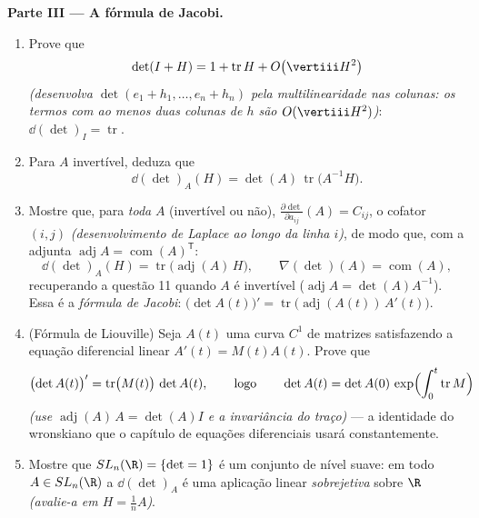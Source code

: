 \begin{problem}
\medskip
\noindent\textbf{Parte III --- A fórmula de Jacobi.}
\begin{enumerate}[resume]
  \item Prove que
        \[
        \det(I + H) = 1 + \operatorname{tr}H +
        O\bigl(\vertiii H^2\bigr)
        \]
        \emph{(desenvolva $\det(e_1 + h_1, \dots, e_n + h_n)$ pela
        multilinearidade nas colunas: os termos com ao menos duas
        colunas de $h$ são $O(\vertiii H^2)$)}: $\dd(\det)_I =
        \operatorname{tr}$.
  \item Para $A$ invertível, deduza que
        \[
        \dd(\det)_A(H) = \det(A)\,
        \operatorname{tr}\bigl(A^{-1}H\bigr) .
        \]
  \item Mostre que, para \emph{toda} $A$ (invertível ou não),
        $\frac{\partial\det}{\partial a_{ij}}(A) = C_{ij}$, o
        cofator $(i,j)$ \emph{(desenvolvimento de Laplace ao longo da linha
        $i$)}, de modo que, com a adjunta $\operatorname{adj}A =
        \operatorname{com}(A)^{\mathsf T}$:
        \[
        \dd(\det)_A(H) =
        \operatorname{tr}\bigl(\operatorname{adj}(A)\,H\bigr),
        \qquad
        \nabla(\det)(A) = \operatorname{com}(A) ,
        \]
        recuperando a questão 11 quando $A$ é invertível
        ($\operatorname{adj}A = \det(A)A^{-1}$). Essa é a
        \emph{fórmula de Jacobi}: $\bigl(\det
        A(t)\bigr)' = \operatorname{tr}\bigl(
        \operatorname{adj}(A(t))\,A'(t)\bigr)$.
  \item (Fórmula de Liouville) Seja $A(t)$ uma curva $C^1$ de
        matrizes satisfazendo a equação diferencial linear
        $A'(t) = M(t)A(t)$. Prove que
        \[
        \bigl(\det A(t)\bigr)' =
        \operatorname{tr}\bigl(M(t)\bigr)\,\det A(t),
        \qquad\text{logo}\qquad
        \det A(t) = \det A(0)\,
        \exp\Bigl(\int_0^t\operatorname{tr}M\Bigr)
        \]
        \emph{(use $\operatorname{adj}(A)\,A = \det(A)I$ e a
        invariância  do traço)} --- a identidade do wronskiano
        que o capítulo de equações diferenciais usará
        constantemente.
  \item Mostre que $SL_n(\R) = \{\det = 1\}$ é um conjunto de nível
        suave: em todo $A \in SL_n(\R)$ a 
        $\dd(\det)_A$ é uma aplicação linear \emph{sobrejetiva} sobre
        $\R$ \emph{(avalie-a em $H = \frac1nA$)}.
\end{enumerate}


\end{problem}
